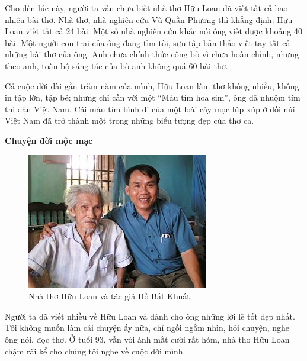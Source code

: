 \documentclass[../main.tex]{subfiles}
\begin{document}
\begin{multicols}{2}
     \begin{blockquote}
Cho đến lúc này, người ta vẫn chưa biết nhà thơ Hữu Loan đã viết tất cả bao nhiêu bài thơ. Nhà thơ, nhà nghiên cứu Vũ Quần Phương thì khẳng định: Hữu Loan viết tất cả 24 bài. Một số nhà nghiên cứu khác nói ông viết được khoảng 40 bài. Một người con trai của ông đang tìm tòi, sưu tập bản thảo viết tay tất cả những bài thơ của ông. Anh chưa chính thức công bố vì chưa hoàn chỉnh, nhưng theo anh, toàn bộ sáng tác của bố anh không quá 60 bài thơ. \end{blockquote}
 Cả cuộc đời dài gần trăm năm của mình, Hữu Loan làm thơ không nhiều, không in tập lớn, tập bé; nhưng chỉ cần với một “Màu tím hoa sim”, ông đã nhuộm tím thi đàn Việt Nam. Cái màu tím bình dị của một loài cây mọc lúp xúp ở đồi núi Việt Nam đã trở thành một trong những biểu tượng đẹp của thơ ca. 
 
 
\textbf{Chuyện đời mộc mạc} 
    
 \begin{figure}
	\centering
	\includegraphics[width=\textwidth]{../img/tho180908_2.jpg}
	\caption{Nhà thơ Hữu Loan và tác giả Hồ Bất Khuất}
\end{figure}
 Người ta đã viết nhiều về Hữu Loan và dành cho ông những lời lẽ tốt đẹp nhất. Tôi không muốn làm cái chuyện ấy nữa, chỉ ngồi ngắm nhìn, hỏi chuyện, nghe ông nói, đọc thơ. Ở tuổi 93, vẫn với ánh mắt cười rất hóm, nhà thơ Hữu Loan chậm rãi kể cho chúng tôi nghe về cuộc đời mình.  
 

\end{multicols}
\end{document}
